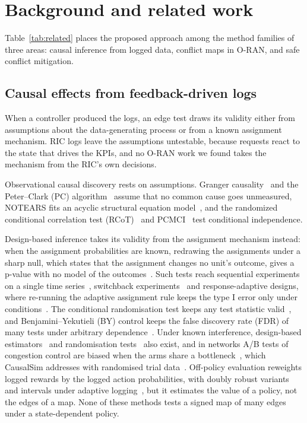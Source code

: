 \section{Background and related work}
\label{sec:related}

Table~\ref{tab:related} places the proposed approach among the method families of three areas: causal inference from
logged data, conflict maps in O-RAN, and safe conflict mitigation.

\subsection{Causal effects from feedback-driven logs}
\label{sec:related_design}

When a controller produced the logs, an edge test draws its validity either from assumptions about the
data-generating process or from a known assignment mechanism. RIC logs leave the assumptions untestable, because
requests react to the state that drives the KPIs, and no O-RAN work we found takes the mechanism from the RIC's own
decisions.

Observational causal discovery rests on assumptions. Granger causality~\cite{granger1969causal} and the
Peter--Clark (PC) algorithm~\cite{spirtes2000causation} assume that no common cause goes unmeasured, NOTEARS fits an
acyclic structural equation model~\cite{zheng2018notears}, and the randomized conditional correlation test
(RCoT)~\cite{strobl2019rcot} and PCMCI~\cite{runge2019pcmci} test conditional independence.

Design-based inference takes its validity from the assignment mechanism instead: when the assignment probabilities
are known, redrawing the assignments under a sharp null, which states that the assignment changes no unit's outcome,
gives a p-value with no model of the outcomes~\cite{imbens2015causal}. Such tests reach sequential experiments on a
single time series~\cite{bojinov2019timeseries}, switchback experiments~\cite{bojinov2023switchback} and
response-adaptive designs, where re-running the adaptive assignment rule keeps the type I error only under
conditions~\cite{simon2011randomization}. The conditional randomisation test keeps any test statistic
valid~\cite{candes2018knockoffs}, and Benjamini--Yekutieli (BY) control keeps the false discovery rate (FDR) of many
tests under arbitrary dependence~\cite[Thm.~1.3]{benjamini2001dependency}. Under known interference, design-based
estimators~\cite{aronow2017interference} and randomisation tests~\cite{basse2019interference} also exist, and in
networks A/B tests of congestion control are biased when the arms share a
bottleneck~\cite{spang2021unbiased}, which CausalSim addresses with randomised trial data~\cite{alomar2023causalsim}.
Off-policy evaluation reweights logged rewards by the logged action probabilities, with doubly robust
variants~\cite{dudik2014doubly} and intervals under adaptive logging~\cite{hadad2021adaptive,zhang2021mestimators},
but it estimates the value of a policy, not the edges of a map. None of these methods tests a signed map of many
edges under a state-dependent policy.

